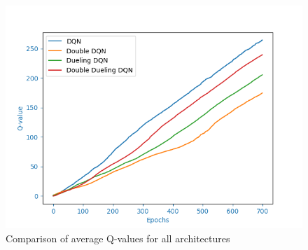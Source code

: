 \begin{figure}[h]
    \centering
    \includegraphics[width=12cm]{img/cumulated_qval.png}
    \caption{Comparison of average Q-values for all architectures}
    \label{fig:results-qval-comparison}
\end{figure}